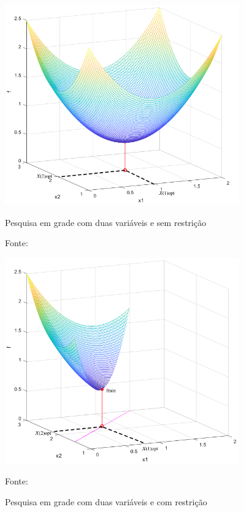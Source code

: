 \begin{figure}[h]
    \centering
    \begin{minipage}{0.45\textwidth}
        \centering
        \includegraphics[width=0.9\textwidth]{./5_images/fig_grid_search_vectorial1.png} 
		\caption{Pesquisa em grade com duas variáveis e sem restrição}
		\label{fig:grid_search_vectorial_nobounds}
		Fonte: 
    \end{minipage}\hfill
    \begin{minipage}{0.45\textwidth}
        \centering
        \includegraphics[width=0.9\textwidth]{./5_images/fig_grid_search_vectorial2.png} 
		\caption{Pesquisa em grade com duas variáveis e com restrição}  
		\label{fig:grid_search_vectorial_withbounds}		      
		Fonte: 
	\end{minipage}
\end{figure}


